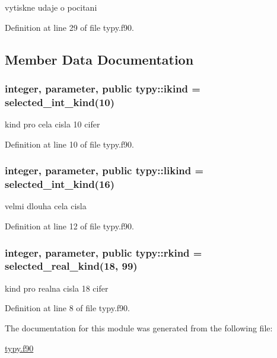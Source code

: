 vytiskne udaje o pocitani 



\-Definition at line 29 of file typy.\-f90.



\subsection{\-Member \-Data \-Documentation}
\hypertarget{classtypy_a80b310812529ce60b2aec26670db402c}{
\subsubsection[{ikind}]{\setlength{\rightskip}{0pt plus 5cm}integer, parameter, public {\bf typy\-::ikind} = selected\-\_\-int\-\_\-kind(10)}}\label{classtypy_a80b310812529ce60b2aec26670db402c}


kind pro cela cisla 10 cifer 



\-Definition at line 10 of file typy.\-f90.

\hypertarget{classtypy_a2d07d3bd8360ffc201ade93859a7cc84}{
\subsubsection[{likind}]{\setlength{\rightskip}{0pt plus 5cm}integer, parameter, public {\bf typy\-::likind} = selected\-\_\-int\-\_\-kind(16)}}\label{classtypy_a2d07d3bd8360ffc201ade93859a7cc84}


velmi dlouha cela cisla 



\-Definition at line 12 of file typy.\-f90.

\hypertarget{classtypy_a2169287dfed38b596625c595cf3b5677}{
\subsubsection[{rkind}]{\setlength{\rightskip}{0pt plus 5cm}integer, parameter, public {\bf typy\-::rkind} = selected\-\_\-real\-\_\-kind(18, 99)}}\label{classtypy_a2169287dfed38b596625c595cf3b5677}


kind pro realna cisla 18 cifer 



\-Definition at line 8 of file typy.\-f90.



\-The documentation for this module was generated from the following file\-:\begin{DoxyCompactItemize}
\item 
\hyperlink{typy_8f90}{typy.\-f90}\end{DoxyCompactItemize}
